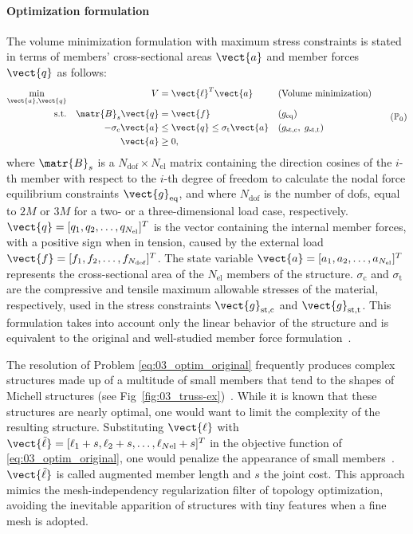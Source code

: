 \paragraph{Optimization formulation}
The volume minimization formulation with maximum stress constraints is stated in terms of members' cross-sectional areas $\vect{a}$ and member forces $\vect{q}$ as follows:
\begin{equation}
    \begin{aligned}
    \min_{\vect{a}, \vect{q}}   && V &= \vect{\ell}^{T}\vect{a} && \textrm{(Volume minimization)}\\
    \textrm{s.t.}   && \matr{B}_s\vect{q} &= \vect{f} && (g_\text{eq})\\
    && -\sigma_\text{c}\vect{a} &\leq \vect{q} \leq \sigma_\text{t}\vect{a} && (g_\text{st,c}, \; g_\text{st,t}) \\
    && \vect{a} &\geq 0, \\
    \end{aligned}
    \tag{$\mathbb{P}_0$}
    \label{eq:03_optim_original}
\end{equation}
where $\matr{B}_s$ is a $N_{\text{dof}} \times N_{\text{el}}$ matrix containing the direction cosines of the $i$-th member with respect to the $i$-th degree of freedom to calculate the nodal force equilibrium constraints $\vect{g}_\text{eq}$, and where $N_{\text{dof}}$ is the number of \gls{dofs}, equal to $2M$ or $3M$ for a two- or a three-dimensional load case, respectively. $\vect{q} = [q_1, q_2, \ldots,q_{N_{\text{el}}}]^T$ is the vector containing the internal member forces, with a positive sign when in tension, caused by the external load $\vect{f} = [f_1, f_2, \ldots,f_{N_{\text{dof}}}]^T$. The state variable $\vect{a} = [a_1, a_2, \ldots,a_{N_{\text{el}}}]^T$ represents the cross-sectional area of the $N_{\text{el}}$ members of the structure. $\sigma_\text{c}$ and $\sigma_\text{t}$ are the compressive and tensile maximum allowable stresses of the material, respectively, used in the stress constraints $\vect{g}_\text{st,c}$ and $\vect{g}_\text{st,t}$. This formulation takes into account only the linear behavior of the structure and is equivalent to the original and well-studied member force formulation~.

The resolution of Problem \ref{eq:03_optim_original} frequently produces complex structures made up of a multitude of small members that tend to the shapes of Michell structures (see Fig~\ref{fig:03_truss-ex})~. While it is known that these structures are nearly optimal, one would want to limit the complexity of the resulting structure. Substituting $\vect{\ell}$ with $\vect{\tilde{\ell}} = [\ell_1 + s, \ell_2 + s, \ldots,\ell_{N\text{el}} + s]^T$ in the objective function of \ref{eq:03_optim_original}, one would penalize the appearance of small members~. $\vect{\tilde{\ell}}$ is called augmented member length and $s$ the joint cost. This approach mimics the mesh-independency regularization filter of topology optimization, avoiding the inevitable apparition of structures with tiny features when a fine mesh is adopted.

